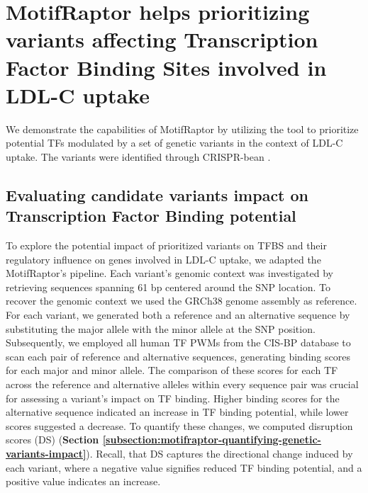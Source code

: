 \documentclass[a4paper, titlepage, openright]{book}
\newcommand{\motifraptor}{MotifRaptor\xspace}
\begin{document}
\section{\motifraptor helps prioritizing variants affecting Transcription Factor Binding Sites involved in LDL-C uptake}
We demonstrate the capabilities of \motifraptor by utilizing the tool to prioritize potential TFs modulated by a set of genetic variants in the context of LDL-C uptake. The variants were identified through CRISPR-bean \citep{ryu2023joint}.

\subsection{Evaluating candidate variants impact on Transcription Factor Binding potential}
To explore the potential impact of prioritized variants on TFBS and their regulatory influence on genes involved in LDL-C uptake, we adapted the \motifraptor's pipeline. Each variant's genomic context was investigated by retrieving sequences spanning 61 bp centered around the SNP location. To recover the genomic context we used the GRCh38 genome assembly as reference. For each variant, we generated both a reference and an alternative sequence by substituting the major allele with the minor allele at the SNP position. Subsequently, we employed all human TF PWMs from the CIS-BP database \citep{weirauch2014determination} to scan each pair of reference and alternative sequences, generating binding scores for each major and minor allele. The comparison of these scores for each TF across the reference and alternative alleles within every sequence pair was crucial for assessing a variant's impact on TF binding. Higher binding scores for the alternative sequence indicated an increase in TF binding potential, while lower scores suggested a decrease. To quantify these changes, we computed disruption scores (DS) (\textbf{Section \ref{subsection:motifraptor-quantifying-genetic-variants-impact}}). Recall, that DS captures the directional change induced by each variant, where a negative value signifies reduced TF binding potential, and a positive value indicates an increase.
\end{document}
